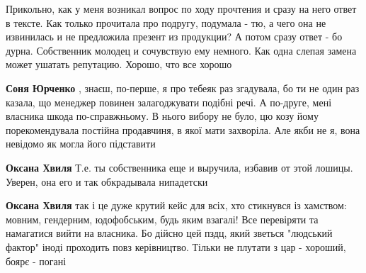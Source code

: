 \begin{itemize}
 

Прикольно, как у меня возникал вопрос по ходу прочтения и сразу на него ответ в
тексте. Как только прочитала про подругу, подумала - тю, а чего она не
извинилась и не предложила презент из продукции? А потом сразу ответ - бо
дурна. Собственник молодец и сочувствую ему немного. Как одна слепая замена
может ушатать репутацию. Хорошо, что все хорошо

\begin{itemize}
 
\textbf{Соня Юрченко} , знаєш, по-перше, я про тебеяк раз згадувала, бо ти не
один раз казала, що менеджер повинен залагоджувати подібні речі. А по-друге,
мені власника шкода по-справжньому. В нього вибору не було, цю козу йому
порекомендувала постійна продавчиня, в якої мати захворіла. Але якби не я, вона
невідомо як могла його підставити

 
\textbf{Оксана Хвиля} Т.е. ты собственника еще и выручила, избавив от этой лошицы. \Smiley[1.0][yellow] Уверен, она его и так обкрадывала нипадетски

 
\textbf{Оксана Хвиля} так і це дуже крутий кейс для всіх, хто стикнувся із
хамством: мовним, гендерним, юдофобським, будь яким взагалі! Все перевіряти та
намагатися вийти на власника. Бо дійсно цей пздц, який зветься "людський
фактор" іноді проходить повз керівництво. Тільки не плутати з цар - хороший,
боярє - погані

 

\end{itemize}
\end{itemize}
